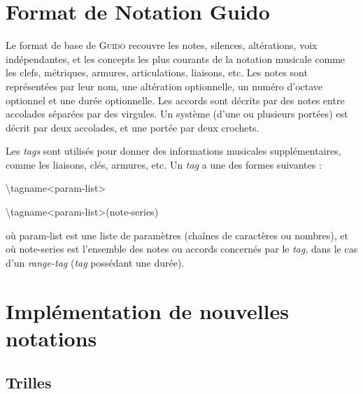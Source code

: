\documentclass{article}
\newenvironment{code}
  {\fontfamily{pnc}\selectfont}{}
\begin{document}
\section{Format de Notation Guido}\label{sec:format_notation}


Le format de base de \textsc{Guido} recouvre les notes, silences, altérations, voix indépendantes, et les concepts les plus courants de la notation musicale comme les clefs, métriques, armures, articulations, liaisons, etc.
Les notes sont représentées par leur nom, une altération optionnelle, un numéro d’octave optionnel et une durée optionnelle. Les accords sont décrits par des notes entre accolades séparées par des virgules. Un système (d'une ou plusieurs portées) est décrit par deux accolades, et une portée par deux crochets.


Les \emph{tags} sont utilisés pour donner des informations musicales supplémentaires, comme les liaisons, clés, armures, etc. Un \emph{tag} a une des formes suivantes : 

\begin{code}
\textbackslash{}tagname\textless{}param-list\textgreater{}

\textbackslash{}tagname\textless{}param-list\textgreater{}(note-series)
\end{code}

où param-list est une liste de paramètres (chaînes de caractères ou nombres), et où note-series est l'ensemble des notes ou accords concernés par le \emph{tag}, dans le cas d'un \emph{range-tag} (\emph{tag} possédant une durée).

\section{Implémentation de nouvelles notations}\label{sec:nouvelles_notations}

\subsection{Trilles}\label{subsec:trilles}
\end{document}
